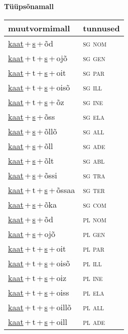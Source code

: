 
\vspace{1.8em}
\begin{minipage}{\textwidth}
\textbf{Tüüpsõnamall \,}\\

\begin{sideways}
\begin{tabular}{l l}
muutvormimall & tunnused \\
\hline
\underline{kaat}\,+\,\underline{s}\,+\,õd & \textsc{ sg nom } \\
\underline{kaat}\,+\,t\,+\,\underline{s}\,+\,ojõ & \textsc{ sg gen } \\
\underline{kaat}\,+\,t\,+\,\underline{s}\,+\,oit & \textsc{ sg par } \\
\underline{kaat}\,+\,t\,+\,\underline{s}\,+\,oisõ & \textsc{ sg ill } \\
\underline{kaat}\,+\,t\,+\,\underline{s}\,+\,õz & \textsc{ sg ine } \\
\underline{kaat}\,+\,\underline{s}\,+\,õss & \textsc{ sg ela } \\
\underline{kaat}\,+\,\underline{s}\,+\,õllõ & \textsc{ sg all } \\
\underline{kaat}\,+\,\underline{s}\,+\,õll & \textsc{ sg ade } \\
\underline{kaat}\,+\,\underline{s}\,+\,õlt & \textsc{ sg abl } \\
\underline{kaat}\,+\,\underline{s}\,+\,õssi & \textsc{ sg tra } \\
\underline{kaat}\,+\,t\,+\,\underline{s}\,+\,õssaa & \textsc{ sg ter } \\
\underline{kaat}\,+\,\underline{s}\,+\,õka & \textsc{ sg com } \\
\underline{kaat}\,+\,\underline{s}\,+\,õd & \textsc{ pl nom } \\
\underline{kaat}\,+\,\underline{s}\,+\,ojõ & \textsc{ pl gen } \\
\underline{kaat}\,+\,t\,+\,\underline{s}\,+\,oit & \textsc{ pl par } \\
\underline{kaat}\,+\,t\,+\,\underline{s}\,+\,oisõ & \textsc{ pl ill } \\
\underline{kaat}\,+\,t\,+\,\underline{s}\,+\,oiz & \textsc{ pl ine } \\
\underline{kaat}\,+\,t\,+\,\underline{s}\,+\,oiss & \textsc{ pl ela } \\
\underline{kaat}\,+\,t\,+\,\underline{s}\,+\,oillõ & \textsc{ pl all } \\
\underline{kaat}\,+\,t\,+\,\underline{s}\,+\,oill & \textsc{ pl ade } \\

\end{tabular}
\end{sideways}
\end{minipage}
